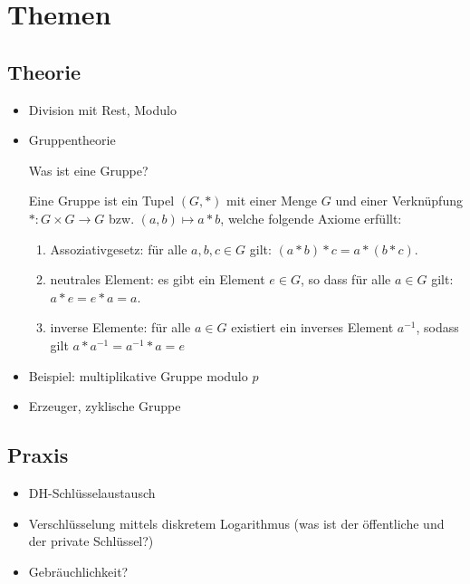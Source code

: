 \documentclass[
  a4paper,
  11pt,
]{article}
\title{}
\author{}
\begin{document}
\section*{Themen}
\label{sec:Themen}

\subsection*{Theorie}
\label{sub:Theorie}

\begin{itemize}
  \item Division mit Rest, Modulo

  \item Gruppentheorie

    Was ist eine Gruppe?

      Eine Gruppe ist ein Tupel $(G, *)$ mit einer Menge $G$ und einer
      Verknüpfung $*: G \times G \to G$ bzw. $(a, b) \mapsto a * b$, welche
      folgende Axiome erfüllt:
      \begin{enumerate}
        \item Assoziativgesetz: für alle $a,b,c \in G$ gilt: $(a * b) * c = a
          * (b * c)$.
        \item neutrales Element: es gibt ein Element $e \in G$, so dass für
          alle $a \in G$ gilt: $a * e = e * a = a$.
        \item inverse Elemente: für alle $a \in G$ existiert ein inverses
          Element $a^{-1}$, sodass gilt $a * a^{-1} = a^{-1} * a = e$
      \end{enumerate}

  \item Beispiel: multiplikative Gruppe modulo $p$

  \item Erzeuger, zyklische Gruppe
\end{itemize}

\subsection*{Praxis}
\label{sub:Praxis}

\begin{itemize}
  \item DH-Schlüsselaustausch
  \item Verschlüsselung mittels diskretem Logarithmus (was ist der öffentliche
    und der private Schlüssel?)
  \item Gebräuchlichkeit?
\end{itemize}
\end{document}
